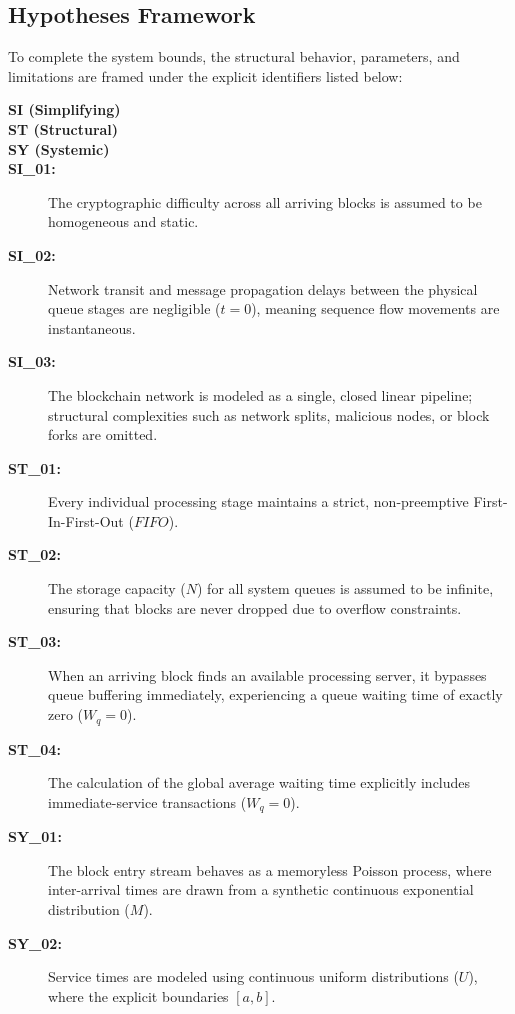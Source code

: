 \documentclass[12pt,a4paper]{article}
\begin{document}
	\subsection{Hypotheses Framework}
	To complete the system bounds, the structural behavior, parameters, and limitations are framed under the explicit identifiers listed below:
	
	
	
	\begin{description}
		\item[\textbf{SI (Simplifying)}]
		\item[\textbf{ST (Structural)}]
		\item[\textbf{SY (Systemic)}]
		\item[\textbf{SI\_01:}] The cryptographic difficulty across all arriving blocks is assumed to be homogeneous and static.
		\item[\textbf{SI\_02:}] Network transit and message propagation delays between the physical queue stages are negligible ($t = 0$), meaning sequence flow movements are instantaneous.
		\item[\textbf{SI\_03:}] The blockchain network is modeled as a single, closed linear pipeline; structural complexities such as network splits, malicious nodes, or block forks are omitted.
		
		\item[\textbf{ST\_01:}] Every individual processing stage maintains a strict, non-preemptive First-In-First-Out ($FIFO$).
		\item[\textbf{ST\_02:}] The storage capacity ($N$) for all system queues is assumed to be infinite, ensuring that blocks are never dropped due to overflow constraints.
		\item[\textbf{ST\_03:}] When an arriving block finds an available processing server, it bypasses queue buffering immediately, experiencing a queue waiting time of exactly zero ($W_q = 0$).
		\item[\textbf{ST\_04:}] The calculation of the global average waiting time explicitly includes immediate-service transactions ($W_q = 0$).
		
		\item[\textbf{SY\_01:}] The block entry stream behaves as a memoryless Poisson process, where inter-arrival times are drawn from a synthetic continuous exponential distribution ($M$).
		\item[\textbf{SY\_02:}] Service times are modeled using continuous uniform distributions ($U$), where the explicit boundaries $[a, b]$.
	\end{description}
	
\end{document}

